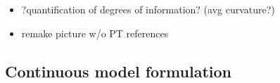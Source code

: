 \documentclass[12pt]{article}
\begin{document}

\begin{itemize}
	\item ?quantification of degrees of information? (avg curvature?)
	\item remake picture w/o PT references
\end{itemize}


%
\subsection{Continuous model formulation}

%
\end{document}
